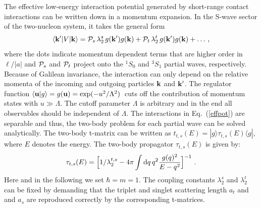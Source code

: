 \documentclass[prc,preprint,tightenlines,showpacs]{revtex4}
\newcommand{\beq}{\begin{equation}}
\newcommand{\eeq}{\end{equation}}
\begin{document}
The effective low-energy interaction potential generated by 
short-range contact interactions can be written
down in a momentum expansion. In the S-wave sector of the two-nucleon
system, it takes the general form
\beq
\langle {\bf k'} | V | {\bf k} \rangle =
{\cal P}_s\,\lambda_2^s\, g({\bf k'})g({\bf k}) +{\cal P}_t\,\lambda_2^t\,
g({\bf k'})g({\bf k}) +\ldots\,,
\label{effpot}
\eeq
where the dots indicate momentum dependent terms that are higher
order in $\ell/|a|$ and ${\cal P}_s$ and ${\cal P}_t$ project onto the 
$^1S_0$ and $^3S_1$ partial waves, respectively.
Because of Galilean invariance, the interaction can only depend on the 
relative momenta of the incoming and outgoing particles 
${\bf k}$ and ${\bf k'}$. The regulator function 
$
\langle{\bf u}|g\rangle= g({\bf u})=\exp(-{u^2}/{\Lambda^2})\,
\label{eq-regu}
$
cuts off the contribution of momentum states with $u \gg \Lambda$.
The cutoff parameter $\Lambda$ is arbitrary and in the end all
observables should be independent of $\Lambda$.
The interactions in Eq.~(\ref{effpot})
are separable and thus, the two-body problem
for each partial wave can be solved analytically. The two-body
t-matrix can be written as 
$t_{t,s}(E)=|g\rangle\tau_{t,s}(E)\langle g|$,
where $E$ denotes the energy. The two-body propagator $\tau_{t,s}(E)$ is
given by:
\begin{equation}
\tau_{t,s}(E)=\Bigl[1/\lambda_2^{t,s}-4\pi\int\hbox{d}q\,
  q^2\frac{g(q)^2}{E-q^2}\Bigr]^{-1}~.
\label{eq-tau}
\end{equation}
Here and in the following we set $\hbar=m=1$. 
The coupling constants $\lambda_2^s$ and $\lambda_2^t$ can be fixed by 
demanding that the triplet and singlet scattering length $a_t$ and
and $a_s$ 
are reproduced correctly by the corresponding t-matrices.
\end{document}
